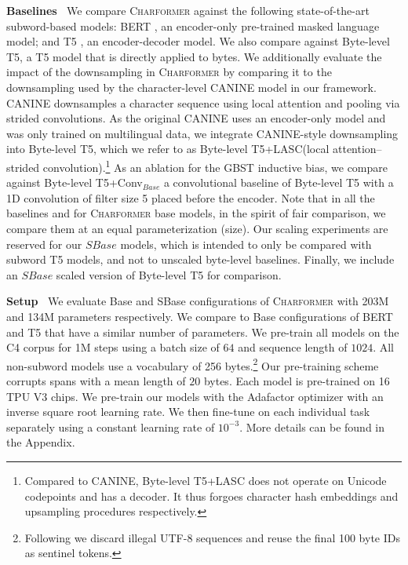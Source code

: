 \documentclass{article} \usepackage{iclr2022_conference,times}
\newcommand{\charformer}{\textsc{Charformer}\xspace}
\newcommand{\byte}{Byte-level T5\xspace}
\newcommand{\canine}{Byte-level T5+LASC\xspace}
\newcommand{\convbase}{Byte-level T5+Conv$_{Base}$\xspace}
\begin{document}
\noindent \textbf{Baselines} $\:$ We compare \charformer against the following state-of-the-art subword-based models: BERT \citep{Devlin2019bert}, an encoder-only pre-trained masked language model; and T5 \citep{Raffel2020t5}, an encoder-decoder model. We also compare against \byte \citep{Xue2021byt5}, a T5 model that is directly applied to bytes. We additionally evaluate the impact of the downsampling in \charformer by comparing it to the downsampling used by the character-level CANINE \citep{clark2021canine} model in our framework. CANINE downsamples a character sequence using local attention and pooling via strided convolutions. As the original CANINE uses an encoder-only model and was only trained on multilingual data, we integrate CANINE-style downsampling into \byte, which we refer to as \canine (local attention–strided convolution).\footnote{Compared to CANINE, \canine does not operate on Unicode codepoints and has a decoder. It thus forgoes character hash embeddings and upsampling procedures respectively.} As an ablation for the GBST inductive bias, we compare against \convbase a convolutional baseline of Byte-level T5 with a 1D convolution of filter size 5 placed before the encoder. Note that in all the baselines and for \charformer base models, in the spirit of fair comparison, we compare them at an equal parameterization (size). Our scaling experiments are reserved for our $SBase$ models, which is intended to only be compared with subword T5 models, and not to unscaled byte-level baselines. Finally, we include an $SBase$ scaled version of \byte for comparison.



\noindent \textbf{Setup} $\:$ We evaluate Base and SBase configurations of \charformer with 203M and 134M parameters respectively. We compare to Base configurations of BERT and T5 that have a similar number of parameters. We pre-train all models on the C4 corpus for 1M steps using a batch size of $64$ and sequence length of $1024$. All non-subword models use a vocabulary of 256 bytes.\footnote{Following \citet{Xue2021byt5} we discard illegal UTF-8 sequences and reuse the final 100 byte IDs as sentinel tokens.}
Our pre-training scheme corrupts spans with a mean length of $20$ bytes. Each model is pre-trained on 16 TPU V3 chips. We pre-train our models with the Adafactor optimizer with an inverse square root learning rate. We then fine-tune on each individual task separately using a constant learning rate of $10^{-3}$. More details can be found in the Appendix.
\end{document}
